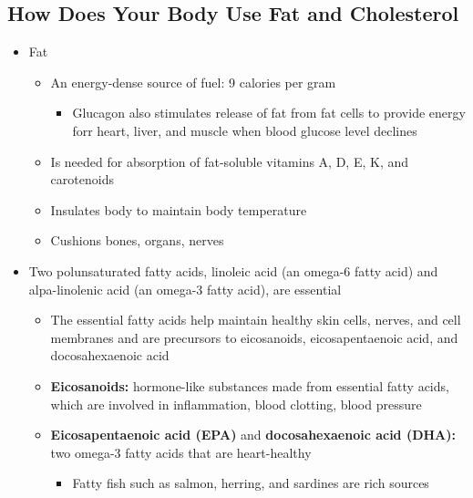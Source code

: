 \documentclass[12pt]{article}
\begin{document}
        \subsection{How Does Your Body Use Fat and Cholesterol}
            \begin{itemize}
                \item Fat
                    \begin{itemize}
                        \item An energy-dense source of fuel: 9 calories per gram
                            \begin{itemize}
                                \item Glucagon also stimulates release of fat from fat cells to provide energy forr heart, liver, and muscle when blood glucose level declines
                            \end{itemize}
                        \item Is needed for absorption of fat-soluble vitamins A, D, E, K, and carotenoids
                        \item Insulates body to maintain body temperature
                        \item Cushions bones, organs, nerves
                    \end{itemize}
                \item Two polunsaturated fatty acids, linoleic acid (an omega-6 fatty acid) and alpa-linolenic acid (an omega-3 fatty acid), are essential
                    \begin{itemize}
                        \item The essential fatty acids help maintain healthy skin cells, nerves, and cell membranes and are precursors to eicosanoids, eicosapentaenoic acid, and docosahexaenoic acid
                        \item \textbf{Eicosanoids:} hormone-like substances made from essential fatty acids, which are involved in inflammation, blood clotting, blood pressure
                        \item \textbf{Eicosapentaenoic acid (EPA)} and \textbf{docosahexaenoic acid (DHA):} two omega-3 fatty acids that are heart-healthy
                            \begin{itemize}
                                \item Fatty fish such as salmon, herring, and sardines are rich sources
                            \end{itemize}

\end{itemize}
\end{itemize}
\end{document}
